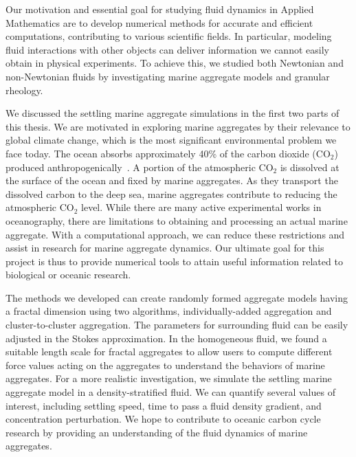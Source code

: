 
Our motivation and essential goal for studying fluid dynamics in Applied Mathematics are to develop numerical methods for accurate and efficient computations, contributing to various scientific fields. In particular, modeling fluid interactions with other objects can deliver information we cannot easily obtain in physical experiments. To achieve this, we studied both Newtonian and non-Newtonian fluids by investigating marine aggregate models and granular rheology.
\par
We discussed the settling marine aggregate simulations in the first two parts of this thesis. 
We are motivated in exploring marine aggregates by their relevance to global climate change, which is the most significant environmental problem we face today.
The ocean absorbs approximately 40\% of the carbon dioxide (CO$_2$) produced anthropogenically~\cite{omand_sinking_2020}. 
A portion of the atmospheric CO$_2$ is dissolved at the surface of the ocean and fixed by marine aggregates. As they transport the dissolved carbon to the deep sea, marine aggregates contribute to reducing the atmospheric CO$_2$ level. 
While there are many active experimental works in oceanography, there are limitations to obtaining and processing an actual marine aggregate. 
With a computational approach, we can reduce these restrictions and assist in research for marine aggregate dynamics. 
Our ultimate goal for this project is thus to provide numerical tools to attain useful information related to biological or oceanic research.
\par
The methods we developed can create randomly formed aggregate models having a fractal dimension using two algorithms, individually-added aggregation and cluster-to-cluster aggregation. The parameters for surrounding fluid can be easily adjusted in the Stokes approximation. 
In the homogeneous fluid, we found a suitable length scale for fractal aggregates to allow users to compute different force values acting on the aggregates to understand the behaviors of marine aggregates.
For a more realistic investigation, we simulate the settling marine aggregate model in a density-stratified fluid.
We can quantify several values of interest, including settling speed, time to pass a fluid density gradient, and concentration perturbation.
We hope to contribute to oceanic carbon cycle research by providing an understanding of the fluid dynamics of marine aggregates. 
